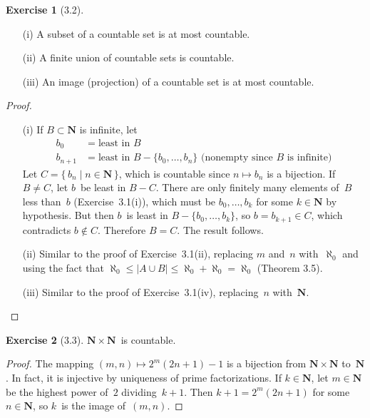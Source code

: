 \documentclass[letterpaper,12pt]{article}
\newcommand{\N}{\boldsymbol{N}}
\newcommand{\al}{\aleph}
\newcommand{\union}{\cup}
\newcommand{\card}[1]{|#1|}
\theoremstyle{definition}
\newtheorem*{exer}{Exercise}
\theoremstyle{remark}
\begin{document}
\begin{exer}[3.2]\
\begin{enumerate}[itemsep=0pt]
\item[(i)] A subset of a countable set is at most countable.
\item[(ii)] A finite union of countable sets is countable.
\item[(iii)] An image (projection) of a countable set is at most countable.
\end{enumerate}
\end{exer}
\begin{proof}\
\begin{enumerate}[itemsep=0pt]
\item[(i)] If \(B\subset\N\) is infinite, let
\begin{align*}
b_0&=\text{least in }B\\
b_{n+1}&=\text{least in }B-\{b_0,\ldots,b_n\}\text{ (nonempty since \(B\)~is infinite)}
\end{align*}
Let \(C=\{\,b_n\mid n\in\N\,\}\), which is countable since \(n\mapsto b_n\) is a bijection. If \(B\ne C\), let \(b\)~be least in \(B-C\). There are only finitely many elements of~\(B\) less than~\(b\) (Exercise~3.1(i)), which must be \(b_0,\ldots,b_k\) for some \(k\in\N\) by hypothesis. But then \(b\)~is least in \(B-\{b_0,\ldots,b_k\}\), so \(b=b_{k+1}\in C\), which contradicts \(b\not\in C\). Therefore \(B=C\). The result follows.
\item[(ii)] Similar to the proof of Exercise~3.1(ii), replacing \(m\) and~\(n\) with~\(\al_0\) and using the fact that \(\al_0\le\card{A\union B}\le\al_0+\al_0=\al_0\) (Theorem 3.5).
\item[(iii)] Similar to the proof of Exercise~3.1(iv), replacing~\(n\) with~\(\N\).\qedhere
\end{enumerate}
\end{proof}

\begin{exer}[3.3]
\(\N\times\N\)~is countable.
\end{exer}
\begin{proof}
The mapping \((m,n)\mapsto 2^m(2n+1)-1\) is a bijection from \(\N\times\N\) to~\(\N\). In fact, it is injective by uniqueness of prime factorizations. If \(k\in\N\), let \(m\in\N\) be the highest power of~\(2\) dividing~\(k+1\). Then \(k+1=2^m(2n+1)\) for some \(n\in\N\), so \(k\)~is the image of~\((m,n)\).
\end{proof}
\end{document}
